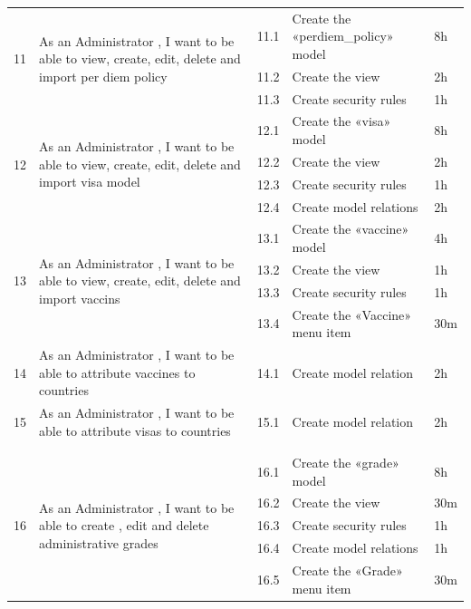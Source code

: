\begin{center}
\begin{longtable}{|p{1cm}|p{}|p{}|p{}|p{}|}
\hline
\multirow{3}{*}{11}
&\multirow{3}{=}{As an Administrator , I want to be able to view, create, edit, delete and import per diem policy}
&11.1
&Create the «perdiem\_policy» model
&8h\\\cline{3-5}
&
&11.2
&Create the view
&2h\\\cline{3-5}
&
&11.3
&Create security rules
&1h\\\cline{3-5}
\hline

\multirow{ 4}{*}{12}
&\multirow{4}{=}{As an Administrator , I want to be able to view, create, edit, delete and import visa model}
&12.1
&Create the «visa» model
&8h\\\cline{3-5}
&
&12.2
&Create the view
&2h\\\cline{3-5}
&
&12.3
&Create security rules
&1h\\\cline{3-5}
&
&12.4
&Create model relations
&2h\\\cline{3-5}
\hline


\multirow{ 4}{*}{13}
&\multirow{4}{=}{As an Administrator , I want to be able to view, create, edit, delete and import vaccins}
&13.1
&Create the «vaccine» model
&4h\\\cline{3-5}
&
&13.2
&Create the view
&1h\\\cline{3-5}
&
&13.3
&Create security rules
&1h\\\cline{3-5}
&
&13.4
&Create the «Vaccine» menu item
&30m\\\cline{3-5}

\hline

14
&As an Administrator , I want to be able to attribute vaccines to countries
&14.1
&Create model relation
&2h\\
\hline

15
&As an Administrator , I want to be able to attribute visas to countries
&15.1
&Create model relation
&2h\\
\hline
\\\\

\multirow{5}{*}{16}
&\multirow{5}{=}{As  an  Administrator  ,  I  want  to be able to create , edit and delete administrative grades}
&16.1
&Create the «grade» model
&8h\\\cline{3-5}
&
&16.2
&Create the view
&30m\\\cline{3-5}
&
&16.3
&Create security rules
&1h\\\cline{3-5}
&
&16.4
&Create model relations
&1h\\\cline{3-5}
&
&16.5
&Create the «Grade» menu item
&30m\\\cline{3-5}
\hline


\end{longtable}
\end{center}
